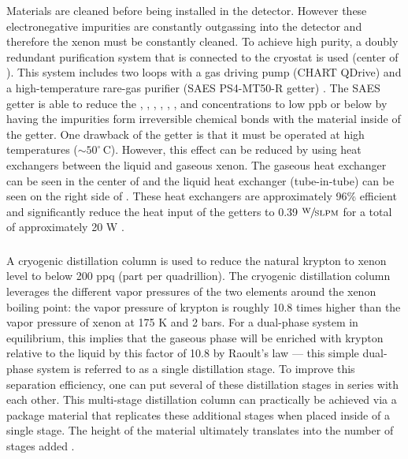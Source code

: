 Materials are cleaned before being installed in the detector.  However these electronegative impurities are constantly outgassing into the detector and therefore the xenon must be constantly cleaned.  To achieve high purity, a doubly redundant purification system that is connected to the cryostat is used (center of ).  This system includes two loops with a gas driving pump (CHART QDrive) and a high-temperature rare-gas purifier (SAES PS4-MT50-R getter) \cite{aprile2017xenon1t}.  The SAES getter is able to reduce the , , , , , , and  concentrations to low ppb or below by having the impurities form irreversible chemical bonds with the material inside of the getter.  One drawback of the getter is that it must be operated at high temperatures ($\sim 50^{\circ} \, \textrm{C}$).  However, this effect can be reduced by using heat exchangers between the liquid and gaseous xenon.  The gaseous heat exchanger can be seen in the center of   and the liquid heat exchanger (tube-in-tube) can be seen on the right side of .  These heat exchangers are approximately 96\% efficient and significantly reduce the heat input of the getters to 0.39 $\sfrac{\textrm{W}}{\textrm{SLPM}}$ for a total of approximately 20 W \cite{aprile2017xenon1t}.

 
 
 \subsubsection{}
  \label{sec:xe1t_pur_kr85}
 
 A cryogenic distillation column is used to reduce the natural krypton to xenon level to below 200 ppq (part per quadrillion).  The cryogenic distillation column leverages the different vapor pressures of the two elements around the xenon boiling point: the vapor pressure of krypton is roughly 10.8 times higher than the vapor pressure of xenon at 175 K and 2 bars.  For a dual-phase system in equilibrium, this implies that the gaseous phase will be enriched with krypton relative to the liquid by this factor of 10.8 by Raoult's law \cite{guggenheim1937theoretical} --- this simple dual-phase system is referred to as a single distillation stage.  To improve this separation efficiency, one can put several of these distillation stages in series with each other.  This multi-stage distillation column can practically be achieved via a package material that replicates these additional stages when placed inside of a single stage.  The height of the material ultimately translates into the number of stages added \cite{fieguth2016distillation}.
 

